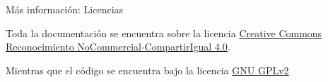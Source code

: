 \documentclass{beamer}
\begin{document}
\begin{frame}{Más información: Licencias}
  
	Toda la documentación se encuentra sobre la licencia
 	\href{https://creativecommons.org/licenses/by-nc-sa/4.0/deed.es}{Creative Commons
	Reconocimiento NoCommercial-CompartirIgual 4.0}.

	\begin{center}\ccbyncsa\end{center}

	\vspace{1cm}

	Mientras que el código se encuentra bajo la licencia \href{https://www.gnu.org/licenses/old-licenses/gpl-2.0.html}{GNU GPLv2}
  
\end{frame}
\end{document}
